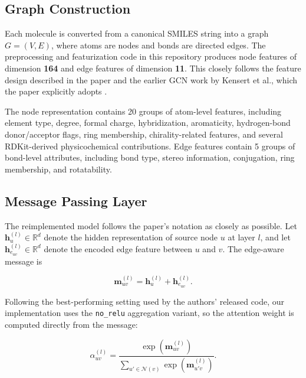 \subsection{Graph Construction}

Each molecule is converted from a canonical SMILES string into a graph
\(
G = (V, E)
\),
where atoms are nodes and bonds are directed edges. The preprocessing and featurization code in this repository produces node features of dimension \textbf{164} and edge features of dimension \textbf{11}. This closely follows the feature design described in the paper and the earlier GCN work by Kensert et al., which the paper explicitly adopts \cite{kang2023deepgcnrt}.

The node representation contains 20 groups of atom-level features, including element type, degree, formal charge, hybridization, aromaticity, hydrogen-bond donor/acceptor flags, ring membership, chirality-related features, and several RDKit-derived physicochemical contributions. Edge features contain 5 groups of bond-level attributes, including bond type, stereo information, conjugation, ring membership, and rotatability.

\subsection{Message Passing Layer}

The reimplemented model follows the paper's notation as closely as possible. Let
\(
\mathbf{h}^{(l)}_u \in \mathbb{R}^d
\)
denote the hidden representation of source node \(u\) at layer \(l\), and let
\(
\mathbf{h}^{(l)}_{e_{uv}} \in \mathbb{R}^d
\)
denote the encoded edge feature between \(u\) and \(v\). The edge-aware message is

\begin{equation}
    \mathbf{m}^{(l)}_{uv} = \mathbf{h}^{(l)}_u + \mathbf{h}^{(l)}_{e_{uv}} .
\end{equation}

Following the best-performing setting used by the authors' released code, our implementation uses the \texttt{no\_relu} aggregation variant, so the attention weight is computed directly from the message:

\begin{equation}
    \alpha^{(l)}_{uv} =
    \frac{\exp \left( \mathbf{m}^{(l)}_{uv} \right)}
    {\sum\limits_{u' \in \mathcal{N}(v)} \exp \left( \mathbf{m}^{(l)}_{u'v} \right)} .
\end{equation}

